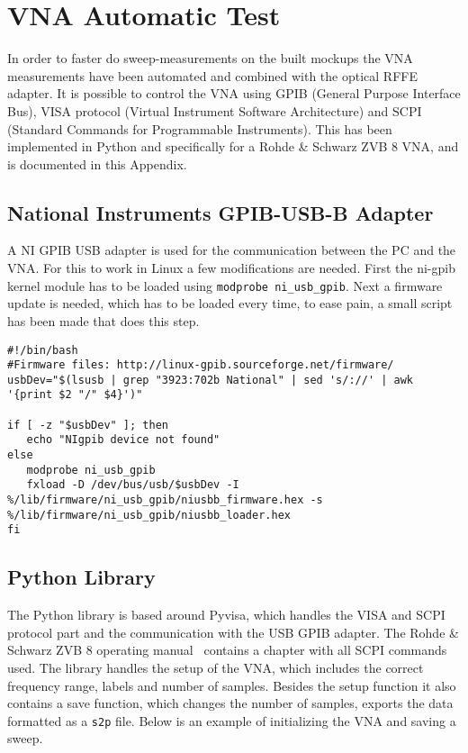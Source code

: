 \section{VNA Automatic Test}
\label{sec:vna_python}
In order to faster do sweep-measurements on the built mockups the VNA measurements have been automated and combined with the optical RFFE adapter. It is possible to control the VNA using GPIB (General Purpose Interface Bus), VISA protocol (Virtual Instrument Software Architecture) and SCPI (Standard Commands for Programmable Instruments). This has been implemented in Python and specifically for a Rohde \& Schwarz ZVB 8 VNA, and is documented in this Appendix. 

\subsection{National Instruments GPIB-USB-B Adapter}
A NI GPIB USB adapter is used for the communication between the PC and the VNA. For this to work in Linux a few modifications are needed. First the ni-gpib kernel module has to be loaded using \verb|modprobe ni_usb_gpib|. Next a firmware update is needed, which has to be loaded every time, to ease pain, a small script has been made that does this step. 

\begin{lstlisting}
#!/bin/bash
#Firmware files: http://linux-gpib.sourceforge.net/firmware/
usbDev="$(lsusb | grep "3923:702b National" | sed 's/://' | awk '{print $2 "/" $4}')"

if [ -z "$usbDev" ]; then
   echo "NIgpib device not found"
else
   modprobe ni_usb_gpib
   fxload -D /dev/bus/usb/$usbDev -I %/lib/firmware/ni_usb_gpib/niusbb_firmware.hex -s %/lib/firmware/ni_usb_gpib/niusbb_loader.hex    
fi
\end{lstlisting}

\subsection{Python Library}
The Python library is based around Pyvisa, which handles the VISA and SCPI protocol part and the communication with the USB GPIB adapter. The Rohde \& Schwarz ZVB 8 operating manual~\cite{RhodeSmanual} contains a chapter with all SCPI commands used. The library handles the setup of the VNA, which includes the correct frequency range, labels and number of samples. Besides the setup function it also contains a save function, which changes the number of samples, exports the data formatted as a \verb|s2p| file. Below is an example of initializing the VNA and saving a sweep. 

